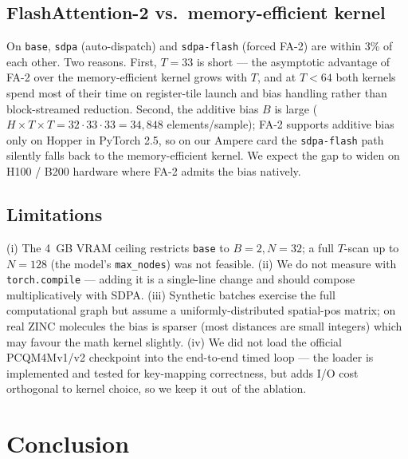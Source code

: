 \documentclass[11pt]{article}
\begin{document}
\subsection{FlashAttention-2 vs.\ memory-efficient kernel}

On \texttt{base}, \texttt{sdpa} (auto-dispatch) and \texttt{sdpa-flash}
(forced FA-2) are within 3\% of each other. Two reasons. First,
$T{=}33$ is short --- the asymptotic advantage of FA-2 over the
memory-efficient kernel grows with $T$, and at $T{<}64$ both kernels
spend most of their time on register-tile launch and bias handling
rather than block-streamed reduction. Second, the additive bias $B$ is
large ($H \times T \times T = 32 \cdot 33 \cdot 33 = 34{,}848$
elements/sample); FA-2 supports additive bias only on Hopper
in PyTorch 2.5, so on our Ampere card the
\texttt{sdpa-flash} path silently falls back to the memory-efficient
kernel. We expect the gap to widen on H100 / B200 hardware where FA-2
admits the bias natively.

\subsection{Limitations}

(i) The 4~GB VRAM ceiling restricts \texttt{base} to $B{=}2,N{=}32$; a
full $T$-scan up to $N{=}128$ (the model's
\texttt{max\_nodes}) was not feasible. (ii) We do not measure with
\texttt{torch.compile} --- adding it is a single-line change and
should compose multiplicatively with SDPA. (iii) Synthetic batches
exercise the full computational graph but assume a uniformly-distributed
spatial-pos matrix; on real ZINC molecules the bias is sparser (most
distances are small integers) which may favour the math kernel slightly.
(iv) We did not load the official PCQM4Mv1/v2 checkpoint into the
end-to-end timed loop --- the loader is implemented and tested for
key-mapping correctness, but adds I/O cost orthogonal to kernel
choice, so we keep it out of the ablation.

\section{Conclusion}
\end{document}
